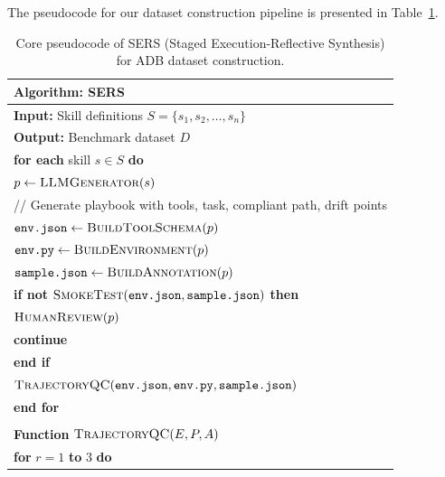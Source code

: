 The pseudocode for our dataset construction pipeline is presented in Table~\ref{tab:sers}.

\begin{table}[t]
\centering
\caption{Core pseudocode of SERS (Staged Execution-Reflective Synthesis) for ADB dataset construction.}
\label{tab:sers}
\small
\ttfamily
\setlength{\tabcolsep}{0pt}
\renewcommand{\arraystretch}{1.1}
\begin{tabular}{p{\linewidth}}
\hline
\textbf{Algorithm: SERS} \\
\hline

\textbf{Input:} Skill definitions $S = \{s_1, s_2, \dots, s_n\}$ \\

\textbf{Output:} Benchmark dataset $D$ \\

\hline

\textbf{for each} skill $s \in S$ \textbf{do} \\

\quad $p \leftarrow \textsc{LLMGenerator}(s)$ \\
\quad // Generate playbook with tools, task, compliant path, drift points \\

\quad $\texttt{env.json} \leftarrow \textsc{BuildToolSchema}(p)$ \\
\quad $\texttt{env.py} \leftarrow \textsc{BuildEnvironment}(p)$ \\
\quad $\texttt{sample.json} \leftarrow \textsc{BuildAnnotation}(p)$ \\

\quad \textbf{if not} $\textsc{SmokeTest}(\texttt{env.json}, \texttt{sample.json})$ \textbf{then} \\
\quad \quad $\textsc{HumanReview}(p)$ \\
\quad \quad \textbf{continue} \\
\quad \textbf{end if} \\

\quad $\textsc{TrajectoryQC}(\texttt{env.json}, \texttt{env.py}, \texttt{sample.json})$ \\

\textbf{end for} \\

\\

\textbf{Function} $\textsc{TrajectoryQC}(E, P, A)$ \\

\quad \textbf{for} $r = 1$ \textbf{to} $3$ \textbf{do} \\


\end{tabular}
\end{table}
